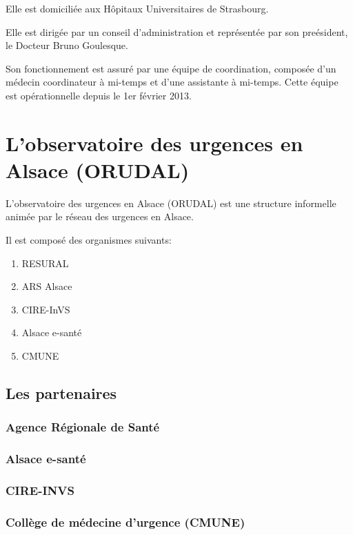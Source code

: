 \documentclass[12pt,english,french,twoside]{report}\usepackage[]{graphicx}\usepackage[]{color}
\begin{document}
Elle est domiciliée aux Hôpitaux Universitaires de Strasbourg.

Elle est dirigée par un conseil d'administration et représentée par son preésident, le Docteur Bruno Goulesque.

Son fonctionnement est assuré par une équipe de coordination, composée d'un médecin coordinateur à mi-temps et d'une assistante à mi-temps. Cette équipe est opérationnelle depuis le 1er février 2013.

\chapter{L'observatoire des urgences en Alsace (ORUDAL)}


L'observatoire des urgences en Alsace (ORUDAL) est une structure informelle animée par le réseau des urgences en Alsace.

Il est composé des organismes suivants:
\begin{enumerate}
  \item RESURAL 
  \item ARS Alsace
  \item CIRE-InVS
  \item Alsace e-santé
  \item CMUNE
\end{enumerate}


\section*{Les partenaires}

  \subsection*{Agence Régionale de Santé}
    
  \subsection*{Alsace e-santé}
    
  \subsection*{CIRE-INVS}
    
  \subsection*{Collège de médecine d'urgence (CMUNE)}
\end{document}
